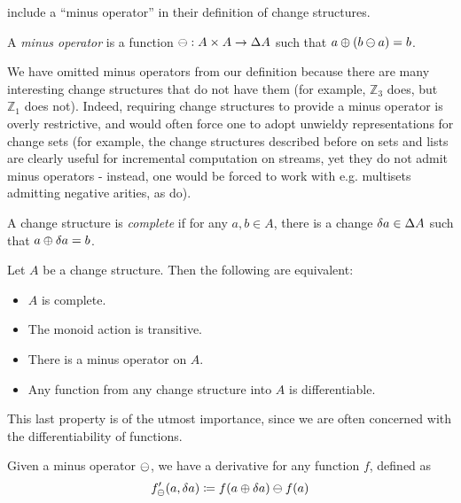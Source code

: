 \textcite{cai2014changes} include a ``minus operator'' in their definition of change structures. 

\begin{defn}
  A \textit{minus operator} is a function $\ominus: A \times A \rightarrow \Delta A$ such that $a \oplus (b \ominus a) = b$.
\end{defn}

We have omitted minus operators from our definition because
there are many interesting change structures that do not have them (for example,
$\mathbb{Z}_3$ does, but $\mathbb{Z}_1$ does not). Indeed, requiring change structures to provide
a minus operator is overly restrictive, and would often force one to adopt unwieldy representations
for change sets (for example, the change structures described before on sets and lists are clearly
useful for incremental computation on streams, yet they do not admit minus operators - instead, one would
be forced to work with e.g. multisets admitting negative arities, as \textcite{cai2014changes} do).

\begin{defn}[Completeness]
  A change structure is \textit{complete} if for any $a, b \in A$, there is
  a change $\delta a \in \Delta A$ such that $a \oplus \delta a = b$.
\end{defn}

\begin{prop}
  Let $A$ be a change structure. Then the following are equivalent:
  \begin{itemize}
    \item $A$ is complete.
    \item The monoid action is transitive.
    \item There is a minus operator on $A$.
    \item Any function from any change structure into $A$ is differentiable.
  \end{itemize}
\end{prop}

This last property is of the utmost importance, since we are often concerned with the differentiability
of functions.

\begin{defn}
  Given a minus operator $\ominus$, we have a derivative for any function $f$,
  defined as
  $$f'_\ominus(a, \delta a) \coloneqq f(a \oplus \delta a) \ominus f(a)$$
\end{defn}

